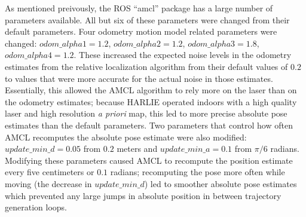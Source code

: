As mentioned preivously, the ROS ``amcl'' package has a large number of parameters available. All but six of these parameters were changed from their default parameters. Four odometry motion model related parameters were changed: $odom\_alpha1 = 1.2$, $odom\_alpha2 = 1.2$, $odom\_alpha3 = 1.8$, $odom\_alpha4 = 1.2$. These increased the expected noise levels in the odometry estimates from the relative localization algorithm from their default values of $0.2$ to values that were more accurate for the actual noise in those estimates. Essentially, this allowed the AMCL algorithm to rely more on the laser than on the odometry estimates; because HARLIE operated indoors with a high quality laser and high resolution \emph{a priori} map, this led to more precise absolute pose estimates than the default parameters. Two parameters that control how often AMCL recomputes the absolute pose estimate were also modified: $update\_min\_d = 0.05$ from $0.2$ meters and $update\_min\_a = 0.1$ from $\pi/6 $ radians. Modifying these parameters caused AMCL to recompute the position estimate every five centimeters or $0.1$ radians; recomputing the pose more often while moving (the decrease in $update\_min\_d$) led to smoother absolute pose estimates which prevented any large jumps in absolute position in between trajectory generation loops.

\begin{comment}
This section details the PSO used on HARLIE and has data and figures and shit for how accurate it is

Outline:
	Why do we need localization? Why do we need PRECISE localization?

	Parts
		Relative Localization
			EKF on HARLIE
		Absolute Localization
			AMCL algorithm
			Needs tuned to prevent pops
		Results

\end{comment}
